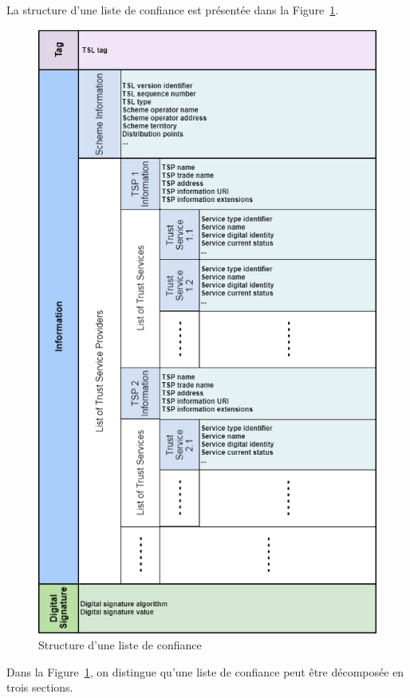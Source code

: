 \documentclass{tnreport}
\begin{document}
La structure d'une liste de confiance est présentée dans la Figure~\ref{fig:tsl-scheme}.

\begin{figure}[h]
	\centering
	\includegraphics[scale=0.65]{figures/tsl-scheme}
	\caption{Structure d'une liste de confiance}
	\label{fig:tsl-scheme}
\end{figure}

\clearpage

Dans la Figure~\ref{fig:tsl-scheme}, on distingue qu'une liste de confiance peut être décomposée en trois sections. 
\end{document}

